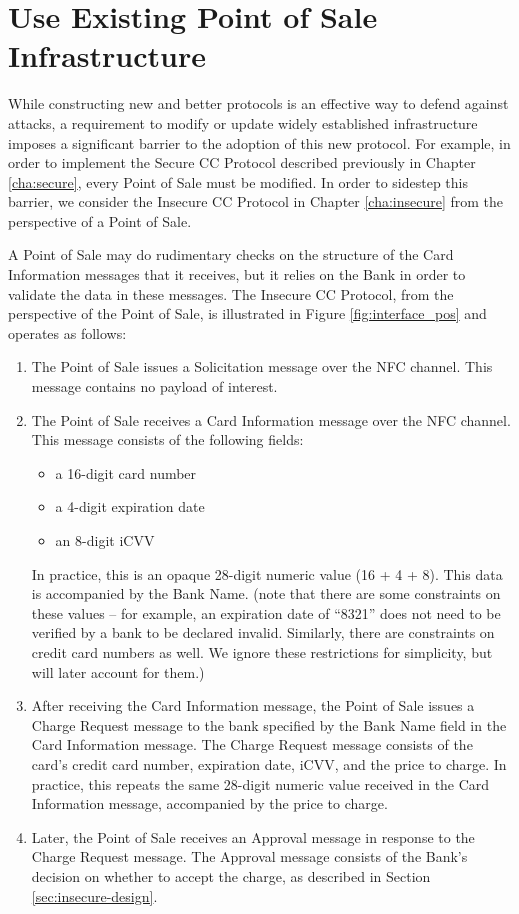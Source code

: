 \section{Use Existing Point of Sale Infrastructure}
\label{sec:goals-infrastructure}

While constructing new and better protocols is an effective way to defend against attacks,
	a requirement to modify or update widely established infrastructure imposes a significant barrier to the adoption of this new protocol.
For example, in order to implement the Secure CC Protocol described previously in Chapter \ref{cha:secure}, every Point of Sale must be modified.
In order to sidestep this barrier, we consider the Insecure CC Protocol in Chapter \ref{cha:insecure} from the perspective of a Point of Sale.

A Point of Sale may do rudimentary checks on the structure of the Card Information messages that it receives,
	but it relies on the Bank in order to validate the data in these messages.
The Insecure CC Protocol, from the perspective of the Point of Sale, is illustrated in Figure \ref{fig:interface_pos} and operates as follows:

\begin{enumerate}
\item The Point of Sale issues a Solicitation message over the NFC channel.
	This message contains no payload of interest.
\item The Point of Sale receives a Card Information message over the NFC channel.
	This message consists of the following fields:
	\begin{itemize}
	\item a 16-digit card number
	\item a 4-digit expiration date
	\item an 8-digit iCVV
	\end{itemize}
	In practice, this is an opaque 28-digit numeric value (16 + 4 + 8).
	This data is accompanied by the Bank Name.
	(note that there are some constraints on these values -- for example, an expiration date of ``8321'' does not need to be verified by a bank to be declared invalid.
	Similarly, there are constraints on credit card numbers as well.
	We ignore these restrictions for simplicity, but will later account for them.)
\item After receiving the Card Information message,
	the Point of Sale issues a Charge Request message to the bank specified by the Bank Name field in the Card Information message.
	The Charge Request message consists of the card's credit card number, expiration date, iCVV, and the price to charge.
	In practice, this repeats the same 28-digit numeric value received in the Card Information message, accompanied by the price to charge.
\item Later, the Point of Sale receives an Approval message in response to the Charge Request message.
	The Approval message consists of the Bank's decision on whether to accept the charge, as described in Section \ref{sec:insecure-design}.
\end{enumerate}

